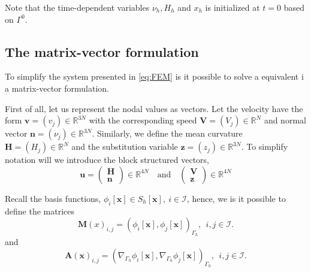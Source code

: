 Note that the time-dependent variables $\nu_{h}, H_{h} $ and $x_{h}$ is initialized at $t=0$  based on $\Gamma ^{0}$.







\subsection{The matrix-vector formulation}%
\label{sub:the_matrix_formulation}

To simplify the system presented in \eqref{eq:FEM} is it possible to solve a equivalent i a matrix-vector formulation.

First of all, let us represent the nodal values as vectors. Let the velocity have the form $\mathbf{v} = \left( v_{j} \right) \in \mathbb{R} ^{3N}$ with the
corresponding speed $\mathbf{V} =
\left( V_{j} \right) \in \mathbb{R} ^{N} $ and normal vector $\mathbf{n} = \left( \nu _{j} \right) \in  \mathbb{R} ^{3N}$. Similarly, we define the mean curvature $\mathbf{H}  = ( H_{j})  \in  \mathbb{R} ^{N}  $ and the substitution variable
$\mathbf{z} = \left( z_{j} \right) \in \mathbb{R} ^{3N}$. To simplify notation will we introduce the block structured vectors,\[
\mathbf{u} = \begin{pmatrix}
\mathbf{H} \\
\mathbf{n}
\end{pmatrix}
\in \mathbb{R} ^{4N}
\quad \text{and} \quad \begin{pmatrix}
\mathbf{V} \\
\mathbf{z}
\end{pmatrix}
\in \mathbb{R} ^{4N}
\]

Recall the basis functions, $\phi_{i} \left[ \mathbf{x} \right] \in S_{h}\left[ \mathbf{x} \right], \   i \in \mathcal{I}  $, hence, we  is it possible to define the matrices \[
\mathbf{M}\left( x \right)_{i,j} =  \left( \phi _{i}\left[ \mathbf{x} \right], \phi_{j} \left[ \mathbf{x} \right] \right) _{ \Gamma _{h}},  \ \   i,j \in \mathcal{I}.
\]
and \[
\mathbf{A}\left( \mathbf{x} \right)_{i,j} = \left( \nabla _{\Gamma _{h}} \phi _{i} \left[ \mathbf{x} \right], \nabla _{\Gamma _{h}}\phi _{j} \left[ \mathbf{x} \right]  \right)_{\Gamma _{h}}, \ \    i,j \in \mathcal{I}.
\]


